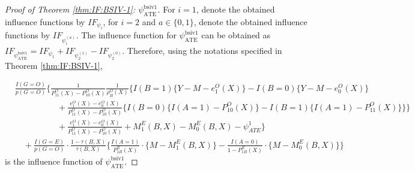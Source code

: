 \documentclass[10pt]{article}
\begin{document}
\begin{proof}[Proof of Theorem \ref{thm:IF:BSIV-1}: $\psi_{\text{ATE}}^{\text{bsiv1}}$]
For $i=1$, denote the obtained influence functions by $IF_{\psi_i}$, for $i=2$ and $a\in\{0,1\}$, denote the obtained influence functions by $IF_{\psi_i^{(a)}}$. The influence function for $\psi_{\text{ATE}}^{\text{bsiv1}}$ can be obtained as $IF_{\psi_{\text{ATE}}^{\text{bsiv1}}}=IF_{\psi_1}+IF_{\psi_2^{(1)}}-IF_{\psi_2^{(0)}}$. Therefore, using the notations specified in Theorem \ref{thm:IF:BSIV-1},

\begin{align*}
&\frac{I(G=O)}{p(G=O)}\Bigg\{\frac{1}{P_{11}^O(X)-P_{10}^O(X)}
\frac{1}{\rho_B^O(X)}\bigg\{I(B=1)\{Y-M-e_1^O(X)\}
-I(B=0)\{Y-M-e_0^O(X)\}\\
&\quad\quad\quad\quad\quad+\frac{e_1^O(X)-e_0^O(X)}{P_{11}^O(X)-P_{10}^O(X)}\big\{I(B=0)\{I(A=1)-P_{10}^O(X)\}-I(B=1)\{I(A=1)-P_{11}^O(X)\}\big\}\bigg\}\\
&\quad\quad\quad\quad\quad+\frac{e_1^O(X)-e_0^O(X)}{P_{11}^O(X)-P_{10}^O(X)}+M_{1}^{E}(B,X)-M_{0}^{E}(B,X)-\psi^1_{ATE}\Bigg\}\\
&\quad+\frac{I(G=E)}{p(G=O)}\cdot\frac{1-\tau(B,X)}{\tau(B,X)}\bigg\{\frac{I(A=1)}{P_{1B}^E(X)}\cdot\{M-M_{1}^{E}(B,X)\}-\frac{I(A=0)}{1-P_{1B}^E(X)}\cdot\{M-M_{0}^{E}(B,X)\}\bigg\}
\end{align*}
is the influence function of $\psi_{\text{ATE}}^{\text{bsiv1}}$.

\end{proof}
\end{document}
